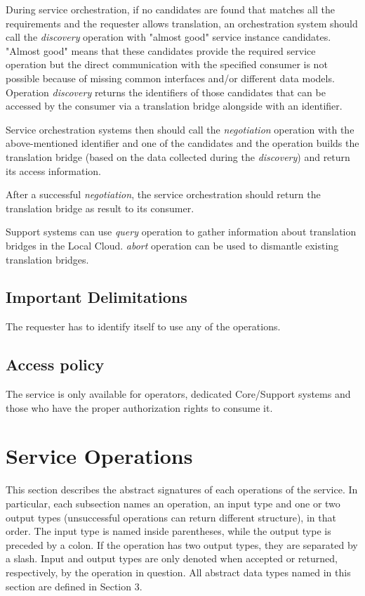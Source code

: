 \documentclass[a4paper]{arrowhead}
\begin{document}
During service orchestration, if no candidates are found that matches all the requirements and the requester allows translation, an orchestration system should call the \textit{discovery} operation with "almost good" service instance candidates. "Almost good" means that these candidates provide the required service operation but the direct communication with the specified consumer is not possible because of missing common interfaces and/or different data models. Operation \textit{discovery} returns the identifiers of those candidates that can be accessed by the consumer via a translation bridge alongside with an identifier.

Service orchestration systems then should call the \textit{negotiation} operation with the above-mentioned identifier and one of the candidates and the operation builds the translation bridge (based on the data collected during the \textit{discovery}) and return its access information.

After a successful \textit{negotiation}, the service orchestration should return the translation bridge as result to its consumer.

Support systems can use \textit{query} operation to gather information about translation bridges in the Local Cloud. \textit{abort} operation can be used to dismantle existing translation bridges.

\subsection{Important Delimitations}
\label{sec:delimitations}

The requester has to identify itself to use any of the operations.

\subsection{Access policy}
\label{sec:accesspolicy}

The service is only available for operators, dedicated Core/Support systems and those who have the proper authorization rights to consume it.

\newpage

\section{Service Operations}
\label{sec:functions}

This section describes the abstract signatures of each operations of the service. In particular, each subsection names an operation, an input type and one or two output types (unsuccessful operations can return different structure), in that order.
The input type is named inside parentheses, while the output type is preceded by a colon. If the operation has two output types, they are separated by a slash.
Input and output types are only denoted when accepted or returned, respectively, by the operation in question. All abstract data types named in this section are defined in Section 3.
\end{document}
